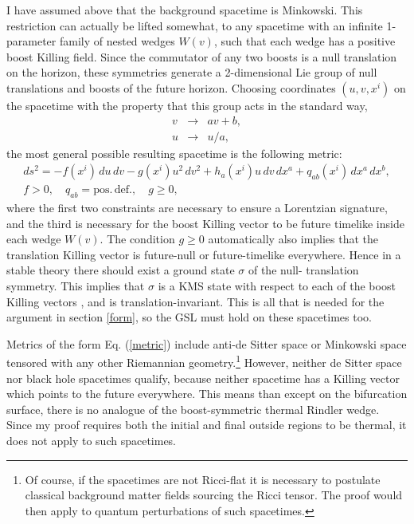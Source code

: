 \documentclass{article}
\begin{document}
I have assumed above that the background spacetime is Minkowski.  This restriction can actually be lifted somewhat, to any spacetime with an infinite 1-parameter family of nested wedges 
$W(v)$, such that each wedge has a positive boost Killing field.  Since the commutator of any two boosts is a null translation on the horizon, these symmetries generate a 2-dimensional Lie group of null translations and boosts of the future horizon.  Choosing coordinates $(u, v, x^i)$ on the spacetime with the property that this group acts in the standard way,
\begin{eqnarray}
v &\to& av + b, \\
u &\to& u/a,
\end{eqnarray}
the most general possible resulting spacetime is the following metric:
\begin{eqnarray}\label{metric}
& ds^2 = - f(x^i)\,du\,dv - g(x^i) u^2\,dv^2 + 
h_a(x^i) u\,dv\,dx^a + q_{ab} (x^i) \,dx^a \,dx^b, &\\
& f > 0, \quad q_{ab} = \mathrm{pos.\,def.}, \quad g \ge 0, &
\end{eqnarray}
where the first two constraints are necessary to ensure a Lorentzian signature, and the third is necessary for the boost Killing vector to be future timelike inside each wedge $W(v)$.  The condition $g \ge 0$ automatically also implies that the translation Killing vector is future-null or future-timelike everywhere.  Hence in a stable theory there should exist a ground state $\sigma$ of the null- translation symmetry.  This implies that $\sigma$ is a KMS state with respect to each of the boost Killing vectors \cite{sewell81}, and is translation-invariant.  This is all that is needed for the argument in section \ref{form}, so the GSL must hold on these spacetimes too.

Metrics of the form Eq. (\ref{metric}) include anti-de Sitter space or Minkowski space tensored with any other Riemannian geometry.\footnote{Of course, if the spacetimes are not Ricci-flat it is necessary to postulate classical background matter fields sourcing the Ricci tensor.  The proof would then apply to quantum perturbations of such spacetimes.}  However, neither de Sitter space nor black hole spacetimes qualify, because neither spacetime has a Killing vector which points to the future everywhere.  This means than except on the bifurcation surface, there is no analogue of the boost-symmetric thermal Rindler wedge.  Since my proof requires both the initial and final outside regions to be thermal, it does not apply to such spacetimes.
\end{document}

